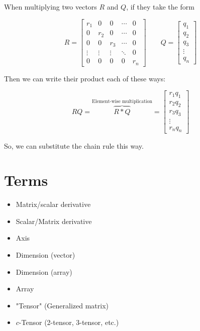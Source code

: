         \begin{concept}
            When multiplying two vectors $R$ and $Q$, if they take the form
            
            \begin{equation*}
                R = 
                \begin{bmatrix}
                    r_1     &0      &0      &\cdots & 0 \\
                    0       &r_2    &0      &\cdots & 0 \\
                    0       &0      &r_3    &\cdots & 0 \\
                    \vdots  &\vdots &\vdots &\ddots & 0 \\
                    0       &0      &0      &0      & r_n 
                \end{bmatrix}
                \qquad
                Q =
                \begin{bmatrix}
                    q_1 \\ q_2\\ q_3 \\ \vdots \\q_n
                \end{bmatrix}
            \end{equation*}
            
            Then we can write their product each of these ways:
            
            \begin{equation*}
                RQ = 
                \overbrace{
                    R * Q
                }^{\text{Element-wise multiplication}}
                =
                \begin{bmatrix}
                    r_1q_1 \\ r_2q_2\\ r_3q_3 \\ \vdots \\r_nq_n
                \end{bmatrix}
            \end{equation*}
        \end{concept}
        
        So, we can substitute the chain rule this way.

\pagebreak
\section{Terms}

    \begin{itemize}
        \item Matrix/scalar derivative
        \item Scalar/Matrix derivative
        \item Axis
        \item Dimension (vector)
        \item Dimension (array)
        \item Array
        \item "Tensor" (Generalized matrix)
        \item $c$-Tensor (2-tensor, 3-tensor, etc.)
    \end{itemize}
        